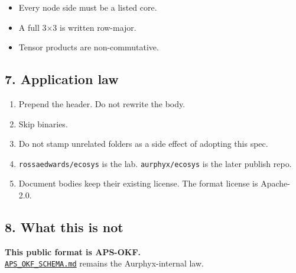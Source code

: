 \begin{itemize}
\tightlist
\item
  Every node side must be a listed core.
\item
  A full 3×3 is written row-major.
\item
  Tensor products are non-commutative.
\end{itemize}

\subsection{7. Application law}\label{application-law}

\begin{enumerate}
\def\labelenumi{\arabic{enumi}.}
\tightlist
\item
  Prepend the header. Do not rewrite the body.
\item
  Skip binaries.
\item
  Do not stamp unrelated folders as a side effect of adopting this spec.
\item
  \texttt{rossaedwards/ecosys} is the lab. \texttt{aurphyx/ecosys} is the later publish repo.
\item
  Document bodies keep their existing license. The format license is Apache-2.0.
\end{enumerate}

\subsection{8. What this is not}\label{what-this-is-not}

\textbf{This public format is APS-OKF.}\\
\href{./APS_OKF_SCHEMA.md}{\texttt{APS\_OKF\_SCHEMA.md}} remains the Aurphyx-internal law.
